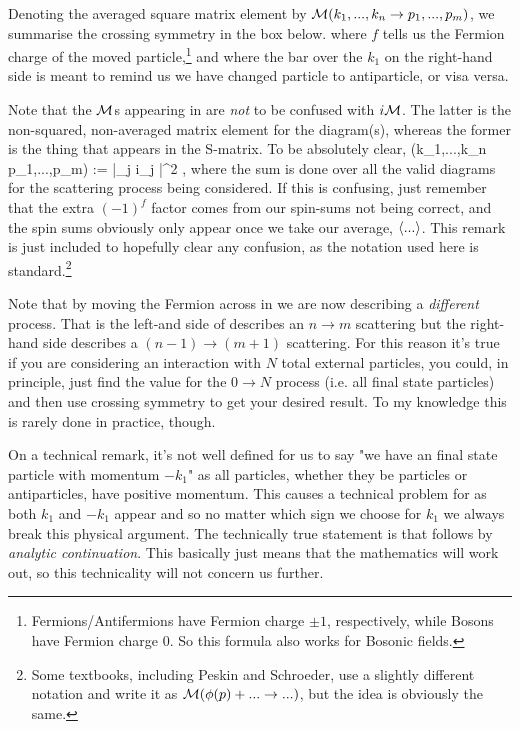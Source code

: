 Denoting the averaged square matrix element by $\mathcal{M}(k_1,...,k_n\to p_1,...,p_m)$, we summarise the crossing symmetry in the box below. 
\noindent where $f$ tells us the Fermion charge of the moved particle,\footnote{Fermions/Antifermions have Fermion charge $\pm1$, respectively, while Bosons have Fermion charge 0. So this formula also works for Bosonic fields.} and where the bar over the $k_1$ on the right-hand side is meant to remind us we have changed particle to antiparticle, or visa versa. 

\br 
    Note that the $\mathcal{M}$s appearing in  are \textit{not} to be confused with $i\mathcal{M}$. The latter is the non-squared, non-averaged matrix element for the diagram(s), whereas the former is the thing that appears in the S-matrix. To be absolutely clear, 
    \bse 
        \cM(k_1,...,k_n \to p_1,...,p_m) := \Big\la \Big|\sum_j i\cM_j \Big|^2 \Big\ra,
    \ese 
    where the sum is done over all the valid diagrams for the scattering process being considered. If this is confusing, just remember that the extra $(-1)^f$ factor comes from our spin-sums not being correct, and the spin sums obviously only appear once we take our average, $\langle ... \rangle$. This remark is just included to hopefully clear any confusion, as the notation used here is standard.\footnote{Some textbooks, including Peskin and Schroeder, use a slightly different notation and write it as $\mathcal{M}(\phi(p) + ... \to ...)$, but the idea is obviously the same.}
\er 

\br 
    Note that by moving the Fermion across in  we are now describing a \textit{different} process. That is the left-and side of  describes an $n\to m$ scattering but the right-hand side describes a $(n-1)\to (m+1)$ scattering. For this reason it's true if you are considering an interaction with $N$ total external particles, you could, in principle, just find the value for the $0\to N$ process (i.e. all final state particles) and then use crossing symmetry to get your desired result. To my knowledge this is rarely done in practice, though. 
\er 

\br 
    On a technical remark, it's not well defined for us to say "we have an final state particle with momentum $-k_1$" as all particles, whether they be particles or antiparticles, have positive momentum. This causes a technical problem for  as both $k_1$ and $-k_1$ appear and so no matter which sign we choose for $k_1$ we always break this physical argument. The technically true statement is that  follows by \textit{analytic continuation}. This basically just means that the mathematics will work out, so this technicality will not concern us further. 
\er 

